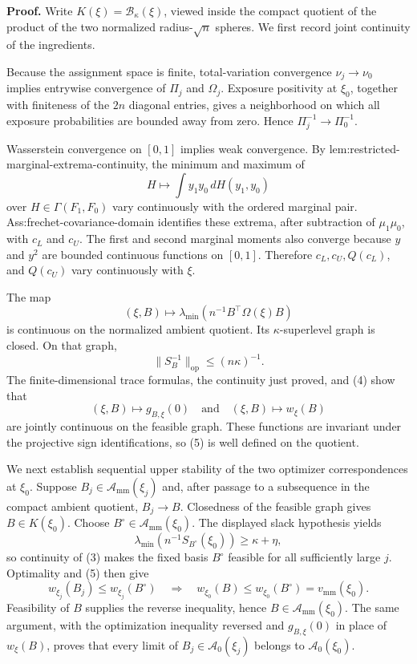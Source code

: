 \textbf{Proof.}
Write \(K(\xi)=\mathcal B_\kappa(\xi)\), viewed inside the compact quotient of the product of the two normalized radius-\(\sqrt n\) spheres.  We first record joint continuity of the ingredients.

Because the assignment space is finite, total-variation convergence \(\nu_j\to\nu_0\) implies entrywise convergence of \(\Pi_j\) and \(\Omega_j\).  Exposure positivity at \(\xi_0\), together with finiteness of the \(2n\) diagonal entries, gives a neighborhood on which all exposure probabilities are bounded away from zero.  Hence \(\Pi_j^{-1}\to\Pi_0^{-1}\).

Wasserstein convergence on \([0,1]\) implies weak convergence.  By lem:restricted-marginal-extrema-continuity, the minimum and maximum of
\[
H\longmapsto\int y_1y_0\,dH(y_1,y_0)
\]
over \(H\in\Gamma(F_1,F_0)\) vary continuously with the ordered marginal pair.  Ass:frechet-covariance-domain identifies these extrema, after subtraction of \(\mu_1\mu_0\), with \(c_L\) and \(c_U\).  The first and second marginal moments also converge because \(y\) and \(y^2\) are bounded continuous functions on \([0,1]\).  Therefore \(c_L,c_U,Q(c_L)\), and \(Q(c_U)\) vary continuously with \(\xi\).

The map
\[
(\xi,B)\longmapsto
\lambda_{\min}\!\left(n^{-1}B^{\top}\Omega(\xi)B\right)
\tag{3}
\]
is continuous on the normalized ambient quotient.  Its \(\kappa\)-superlevel graph is closed.  On that graph,
\[
\lVert S_B^{-1}\rVert_{\mathrm{op}}\le(n\kappa)^{-1}.
\tag{4}
\]
The finite-dimensional trace formulas, the continuity just proved, and (4) show that
\[
(\xi,B)\longmapsto g_{B,\xi}(0)
\quad\text{and}\quad
(\xi,B)\longmapsto w_\xi(B)
\tag{5}
\]
are jointly continuous on the feasible graph.  These functions are invariant under the projective sign identifications, so (5) is well defined on the quotient.

We next establish sequential upper stability of the two optimizer correspondences at \(\xi_0\).  Suppose \(B_j\in\mathcal A_{\mathrm{mm}}(\xi_j)\) and, after passage to a subsequence in the compact ambient quotient, \(B_j\to B\).  Closedness of the feasible graph gives \(B\in K(\xi_0)\).  Choose \(B^\circ\in\mathcal A_{\mathrm{mm}}(\xi_0)\).  The displayed slack hypothesis yields
\[
\lambda_{\min}\!\left(n^{-1}S_{B^\circ}(\xi_0)\right)\ge\kappa+\eta,
\]
so continuity of (3) makes the fixed basis \(B^\circ\) feasible for all sufficiently large \(j\).  Optimality and (5) then give
\[
w_{\xi_j}(B_j)\le w_{\xi_j}(B^\circ)
\quad\Longrightarrow\quad
w_{\xi_0}(B)\le w_{\xi_0}(B^\circ)=v_{\mathrm{mm}}(\xi_0).
\]
Feasibility of \(B\) supplies the reverse inequality, hence \(B\in\mathcal A_{\mathrm{mm}}(\xi_0)\).  The same argument, with the optimization inequality reversed and \(g_{B,\xi}(0)\) in place of \(w_\xi(B)\), proves that every limit of \(B_j\in\mathcal A_0(\xi_j)\) belongs to \(\mathcal A_0(\xi_0)\).

